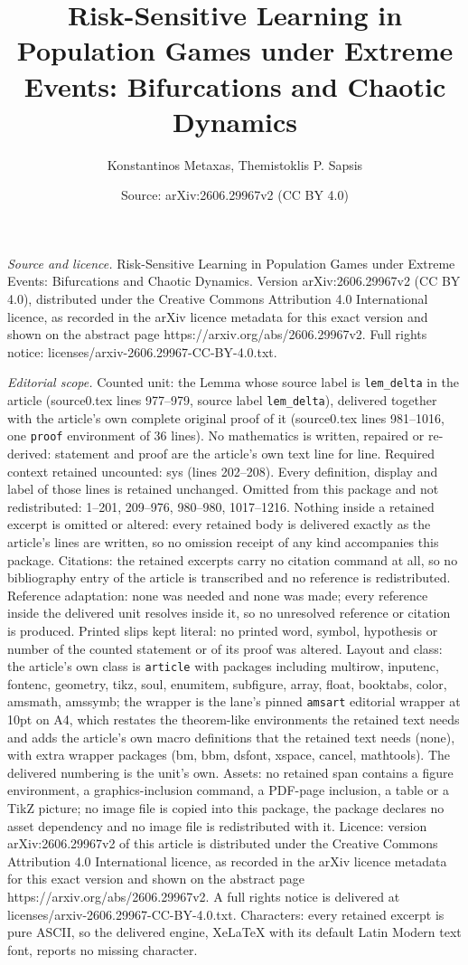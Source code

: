 \documentclass[10pt,a4paper]{amsart}
\title[Risk-Sensitive Learning in Population Games under Extreme Ev]{Risk-Sensitive Learning in Population Games under Extreme Events: Bifurcations and Chaotic Dynamics}
\author{Konstantinos Metaxas, Themistoklis P. Sapsis}
\date{Source: arXiv:2606.29967v2 (CC BY 4.0)}
\begin{document}
\maketitle

\noindent\emph{Source and licence.} Risk-Sensitive Learning in Population Games under Extreme Events: Bifurcations and Chaotic Dynamics. Version arXiv:2606.29967v2 (CC BY 4.0), distributed under the Creative Commons Attribution 4.0 International licence, as recorded in the arXiv licence metadata for this exact version and shown on the abstract page https://arxiv.org/abs/2606.29967v2. Full rights notice: licenses/arxiv-2606.29967-CC-BY-4.0.txt.\par\smallskip

\noindent\textit{Editorial scope.} Counted unit: the Lemma whose source label is \texttt{lem\_delta} in the article (source0.tex lines 977--979, source label \texttt{lem\_delta}), delivered together with the article's own complete original proof of it (source0.tex lines 981--1016, one \texttt{proof} environment of 36 lines). No mathematics is written, repaired or re-derived: statement and proof are the article's own text line for line. Required context retained uncounted: sys (lines 202--208). Every definition, display and label of those lines is retained unchanged. Omitted from this package and not redistributed: 1--201, 209--976, 980--980, 1017--1216. Nothing inside a retained excerpt is omitted or altered: every retained body is delivered exactly as the article's lines are written, so no omission receipt of any kind accompanies this package. Citations: the retained excerpts carry no citation command at all, so no bibliography entry of the article is transcribed and no reference is redistributed. Reference adaptation: none was needed and none was made; every reference inside the delivered unit resolves inside it, so no unresolved reference or citation is produced. Printed slips kept literal: no printed word, symbol, hypothesis or number of the counted statement or of its proof was altered. Layout and class: the article's own class is \texttt{article} with packages including multirow, inputenc, fontenc, geometry, tikz, soul, enumitem, subfigure, array, float, booktabs, color, amsmath, amssymb; the wrapper is the lane's pinned \texttt{amsart} editorial wrapper at 10pt on A4, which restates the theorem-like environments the retained text needs and adds the article's own macro definitions that the retained text needs (none), with extra wrapper packages (bm, bbm, dsfont, xspace, cancel, mathtools). The delivered numbering is the unit's own. Assets: no retained span contains a figure environment, a graphics-inclusion command, a PDF-page inclusion, a table or a TikZ picture; no image file is copied into this package, the package declares no asset dependency and no image file is redistributed with it. Licence: version arXiv:2606.29967v2 of this article is distributed under the Creative Commons Attribution 4.0 International licence, as recorded in the arXiv licence metadata for this exact version and shown on the abstract page https://arxiv.org/abs/2606.29967v2. A full rights notice is delivered at licenses/arxiv-2606.29967-CC-BY-4.0.txt. Characters: every retained excerpt is pure ASCII, so the delivered engine, XeLaTeX with its default Latin Modern text font, reports no missing character.
\end{document}
